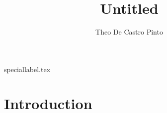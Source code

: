 \documentclass{article}
\title{Untitled}
\author{Theo De Castro Pinto}
\date{}
\begin{document}
\maketitle

\newpage
\tableofcontents
\newpage

{speciallabel.tex}

\newpage

\section{Introduction}

\color{white} \cite{STSM} \color{black}

\newpage

\end{document}
